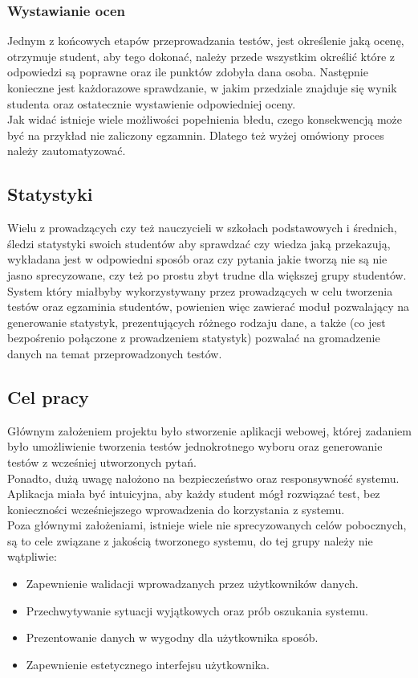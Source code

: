 \documentclass[a4paper, titlepage]{article}
\begin{document}
\subsubsection{Wystawianie ocen}
Jednym z końcowych etapów przeprowadzania testów, jest określenie jaką ocenę, otrzymuje student, aby tego dokonać, należy przede wszystkim określić które z odpowiedzi są poprawne oraz ile punktów zdobyła dana osoba. Następnie konieczne jest każdorazowe sprawdzanie, w jakim przedziale znajduje się wynik studenta oraz ostatecznie wystawienie odpowiedniej oceny.
\\Jak widać istnieje wiele możliwości popełnienia błedu, czego konsekwencją może być na przykład nie zaliczony egzamnin. Dlatego też wyżej omówiony proces należy zautomatyzować.

\subsection{Statystyki}
Wielu z prowadzących czy też nauczycieli w szkołach podstawowych i średnich, śledzi statystyki swoich studentów aby sprawdzać czy wiedza jaką przekazują, wykładana jest w odpowiedni sposób oraz czy pytania jakie tworzą nie są nie jasno sprecyzowane, czy też po prostu zbyt trudne dla większej grupy studentów. System który miałbyby wykorzystywany przez prowadzących w celu tworzenia testów oraz egzaminia studentów, powienien więc zawierać moduł pozwalający na generowanie statystyk, prezentujących różnego rodzaju dane, a także (co jest bezpośrenio połączone z prowadzeniem statystyk) pozwalać na gromadzenie danych na temat przeprowadzonych testów.

\subsection{Cel pracy}
	Głównym założeniem projektu było stworzenie aplikacji webowej, której zadaniem było umożliwienie tworzenia testów jednokrotnego wyboru oraz generowanie testów z wcześniej utworzonych pytań.
\\	Ponadto, dużą uwagę nałożono na bezpieczeństwo oraz responsywność systemu. Aplikacja miała być intuicyjna, aby każdy student mógł rozwiązać test, bez konieczności wcześniejszego wprowadzenia do korzystania z systemu.
\\Poza głównymi założeniami, istnieje wiele nie sprecyzowanych celów pobocznych, są to cele związane z jakością tworzonego systemu, do tej grupy należy nie wątpliwie:
\begin{itemize}
\item Zapewnienie walidacji wprowadzanych przez użytkowników danych.
\item Przechwytywanie sytuacji wyjątkowych oraz prób oszukania systemu.
\item Prezentowanie danych w wygodny dla użytkownika sposób.
\item Zapewnienie estetycznego interfejsu użytkownika.
\end{itemize}
\end{document}
